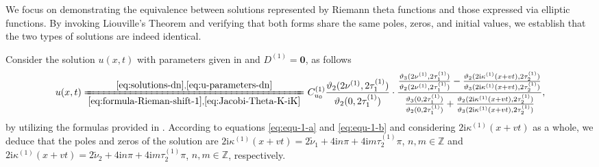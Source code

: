 \documentclass[11pt,reqno]{amsart}
\newcommand{\ii}{\mathrm{i}}
\numberwithin{equation}{section}
\begin{document}
\newenvironment{proof-prop-equivalent}{\emph{\textbf{Proof of \Cref{prop:solutions-equivalent}.}}}{\hfill$\Box$\medskip}
\begin{proof-prop-equivalent}
	We focus on demonstrating the equivalence between solutions represented by Riemann theta functions and those expressed via elliptic functions.
	By invoking Liouville’s Theorem and verifying that both forms share the same poles, zeros, and initial values, we establish that the two types of solutions are indeed identical.
	
	Consider the solution $u(x,t)$ with parameters given in  and $D^{(1)}=\mathbf{0}$, as follows
	\begin{equation}\label{eq:u-convert-p}
		\begin{split}
				u(x,t)
			\xlongequal[\eqref{eq:formula-Rieman-shift-1}, \eqref{eq:Jacobi-Theta-K-iK}]{\eqref{eq:solutions-dn}, \eqref{eq:u-parameters-dn}} 
			&\ C_{u_0}^{(1)}\frac{\vartheta_2(2 \nu^{(1)} ,2  \tau^{(1)}_1)}{\vartheta_2(0 ,2  \tau^{(1)}_1)} \cdot \frac{\frac{\vartheta_3(2 \nu^{(1)} ,2  \tau^{(1)}_1)}{\vartheta_2(2 \nu^{(1)} ,2  \tau^{(1)}_1)}-\frac{\vartheta_2(2\ii  \kappa^{(1)}  (x+vt),2  \tau^{(1)}_2)}{\vartheta_3(2\ii  \kappa^{(1)}  (x+vt),2  \tau^{(1)}_2)}}{\frac{\vartheta_3(0,2  \tau^{(1)}_1)}{\vartheta_2(0,2  \tau^{(1)}_1)}+\frac{\vartheta_2(2\ii  \kappa^{(1)}  (x+vt),2  \tau^{(1)}_2)}{\vartheta_3(2\ii  \kappa^{(1)}  (x+vt),2  \tau^{(1)}_2)}},\\
		\end{split}
	\end{equation}
	by utilizing the formulas provided in .
	According to equations \eqref{eq:equ-1-a} and \eqref{eq:equ-1-b}
	and considering $2\ii  \kappa^{(1)} (x+vt)$ as a whole, we deduce that the poles and zeros of the solution are $2\ii  \kappa^{(1)} (x+vt)=2\tilde{\nu}_1+4\ii n\pi +4\ii m  \tau^{(1)}_2\pi $, $n,m\in \mathbb{Z}$ and $2\ii  \kappa^{(1)} (x+vt)=2\tilde{\nu}_2+4\ii n\pi +4\ii m  \tau^{(1)}_2\pi $, $n,m\in \mathbb{Z}$, respectively.

\end{proof-prop-equivalent}
\end{document}
